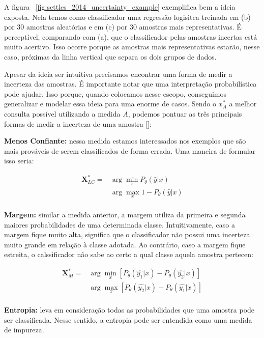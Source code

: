 A figura ~\ref{fig:settles_2014_uncertainty_example} exemplifica bem a ideia exposta. Nela temos como classificador uma regressão logisitca treinada em (b) por 30 amostras aleatórias e em (c) por 30 amostras mais representativas. É perceptível, comparando com (a), que o classificador pelas amostras incertas está muito acertivo. Isso ocorre porque as amostras mais representativas estarão, nesse caso, próximas da linha vertical que separa os dois grupos de dados.

Apesar da ideia ser intuitiva precisamos encontrar uma forma de medir a incerteza das amostras. É importante notar que uma interpretação probabilística pode ajudar. Isso porque, quando colocamos nesse escopo, conseguimos generalizar e modelar essa ideia para uma enorme de casos. Sendo o $x^*_{A}$ a melhor consulta possível utilizando a medida $A$, podemos pontuar as três principais formas de medir a incerteza de uma amostra [\cite{settles2014active}]:

\textbf{Menos Confiante:} nessa medida estamos interessados nos exemplos que são mais prováveis de serem classificados de forma errada. Uma maneira de formular isso seria:

\begin{align*}
\textbf{X}^*_{LC} = &\arg\min_{x} P_{\theta}  (\hat{y}\lvert x)\\
&\arg\max_{x} 1 - P_{\theta}  (\hat{y}\lvert x)\\
\end{align*}

\textbf{Margem:} similar a medida anterior, a margem utiliza da primeira e segunda maiores probabilidades de uma determinada classe. Intuitivamente, caso a margem fique muito alta, significa que o classificador não possui uma incerteza muito grande em relação à classe adotada. Ao contrário, caso a margem fique estreita, o calssificador não sabe ao certo a qual classe aquela amostra pertecen:

\begin{align*}
\textbf{X}^*_{M} = &\arg\min_{x}[ P_{\theta} (\hat{y_{1}}\lvert x) - P_{\theta} (\hat{y_{2}}\lvert x)]\\
&\arg\max_{x}[ P_{\theta} (\hat{y_{2}}\lvert x) - P_{\theta} (\hat{y_{1}}\lvert x)]\\
\end{align*}

\textbf{Entropia:} leva em consideração todas as probabilidades que uma amostra pode ser classificada. Nesse sentido, a entropia pode ser entendida como uma medida de impureza. 

